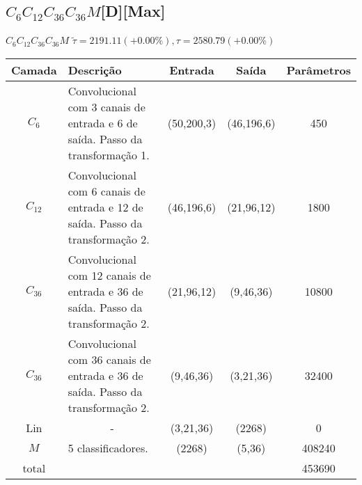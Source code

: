 \begin{tiny}
\section*{$C_6C_{12}C_{36}C_{36}M$[D][Max]}

\begin{table}[H]
	$C_6C_{12}C_{36}C_{36}M$ $\tilde{\tau}=2191.11 (+0.00\%), \tau=2580.79 (+0.00\%)$\newline
	\begin{tabularx}{\linewidth}{ |c|X|c|c|c| }
		\hline
		Camada & Descrição & Entrada & Saída & Parâmetros \\ \hline
		$C_{6}$ & Convolucional com 3 canais de entrada e 6 de saída. Passo da transformação 1. & (50,200,3) & (46,196,6) & 450 \\ \hline
		$C_{12}$ & Convolucional com 6 canais de entrada e 12 de saída. Passo da transformação 2. & (46,196,6) & (21,96,12) & 1800 \\ \hline
		$C_{36}$ & Convolucional com 12 canais de entrada e 36 de saída. Passo da transformação 2. & (21,96,12) & (9,46,36) & 10800 \\ \hline
		$C_{36}$ & Convolucional com 36 canais de entrada e 36 de saída. Passo da transformação 2. & (9,46,36) & (3,21,36) & 32400 \\ \hline
		Lin & \multicolumn{1}{c|}{-} & (3,21,36) & (2268) & 0 \\ \hline
		$M$ & 5 classificadores. & (2268) & (5,36) & 408240 \\ \hline
		total &  &  &  & 453690 \\ \hline
	\end{tabularx}
\end{table}


\end{tiny}
